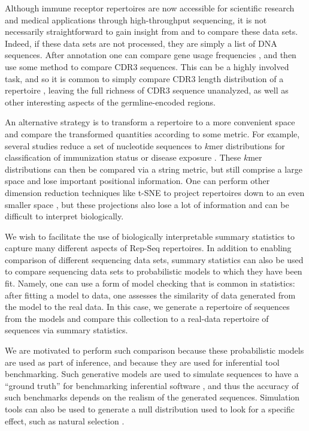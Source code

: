 \documentclass{article}
\begin{document}
Although immune receptor repertoires are now accessible for scientific research and medical applications through high-throughput sequencing, it is not necessarily straightforward to gain insight from and to compare these data sets.
Indeed, if these data sets are not processed, they are simply a list of DNA sequences.
After annotation one can compare gene usage frequencies \cite{Hou2016-qc, Martin2015-ho, Corcoran2016-nw, Gadala2015-wq, Boyd2010-hd, Bolen2017-xt}, and then use some method to compare CDR3 sequences.
This can be a highly involved task, and so it is common to simply compare CDR3 length distribution of a repertoire \cite{Miqueu2007-lk,Larimore2012-lo}, leaving the full richness of CDR3 sequence unanalyzed, as well as other interesting aspects of the germline-encoded regions.


An alternative strategy is to transform a repertoire to a more convenient space and compare the transformed quantities according to some metric.
For example, several studies reduce a set of nucleotide sequences to $k$mer distributions for classification of immunization status or disease exposure \cite{Madi2014-lt, Ostmeyer2017-xg, Heather2017pf}.
These $k$mer distributions can then be compared via a string metric, but still comprise a large space and lose important positional information.
One can perform other dimension reduction techniques like t-SNE to project repertoires down to an even smaller space \cite{Yokota2017-zm}, but these projections also lose a lot of information and can be difficult to interpret biologically.

We wish to facilitate the use of biologically interpretable summary statistics to capture many different aspects of Rep-Seq repertoires.
In addition to enabling comparison of different sequencing data sets, summary statistics can also be used to compare sequencing data sets to probabilistic models to which they have been fit.
Namely, one can use a form of model checking that is common in statistics: after fitting a model to data, one assesses the similarity of data generated from the model to the real data.
In this case, we generate a repertoire of sequences from the models and compare this collection to a real-data repertoire of sequences via summary statistics.

We are motivated to perform such comparison because these probabilistic models are used as part of inference, and because they are used for inferential tool benchmarking.
Such generative models are used to simulate sequences to have a ``ground truth'' for benchmarking inferential software \cite{Ralph2016-iz,Gupta2017-ve,Marcou2018-du}, and thus the accuracy of such benchmarks depends on the realism of the generated sequences.
Simulation tools can also be used to generate a null distribution used to look for a specific effect, such as natural selection \cite{Yaari2012-kk}.
\end{document}
